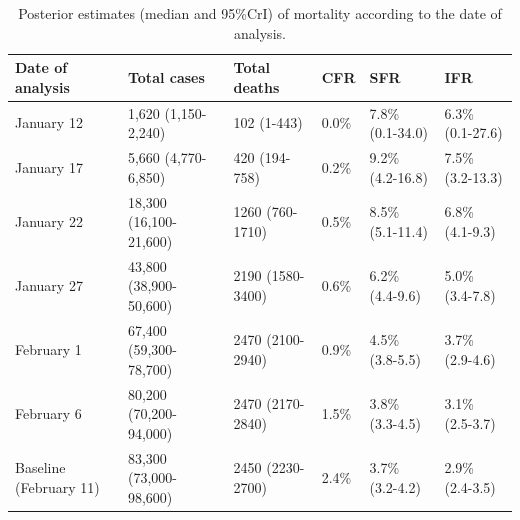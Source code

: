 \documentclass{article}
\begin{document}
\begin{table}[ht]
	\caption{Posterior estimates (median and 95\%CrI) of mortality according to the date of analysis.}
	\label{tab:timesst}
	\centering
	\begin{tabular}{p{2.6cm}lllll}
		\hline
		Date of analysis & Total cases & Total deaths & CFR & SFR & IFR \\ 
		\hline
		January 12 & 1,620 (1,150-2,240) & 102 (1-443) & 0.0\% & 7.8\% (0.1-34.0) & 6.3\% (0.1-27.6) \\ 
		January 17 & 5,660 (4,770-6,850) & 420 (194-758) & 0.2\%  & 9.2\% (4.2-16.8) & 7.5\% (3.2-13.3) \\ 
		January 22 & 18,300 (16,100-21,600) & 1260 (760-1710) & 0.5\%  & 8.5\% (5.1-11.4) & 6.8\% (4.1-9.3) \\ 
		January 27 & 43,800 (38,900-50,600) & 2190 (1580-3400) & 0.6\%  & 6.2\% (4.4-9.6) & 5.0\% (3.4-7.8) \\ 
		February 1 & 67,400 (59,300-78,700) & 2470 (2100-2940) & 0.9\%  & 4.5\% (3.8-5.5) & 3.7\% (2.9-4.6) \\ 
		February 6 & 80,200 (70,200-94,000) & 2470 (2170-2840) & 1.5\% & 3.8\% (3.3-4.5) & 3.1\% (2.5-3.7) \\ 
		Baseline \hspace{2em}(February 11) & 83,300 (73,000-98,600) & 2450 (2230-2700) & 2.4\%  & 3.7\% (3.2-4.2) & 2.9\% (2.4-3.5) \\ 
		\hline
	\end{tabular}
\end{table}
\end{document}
